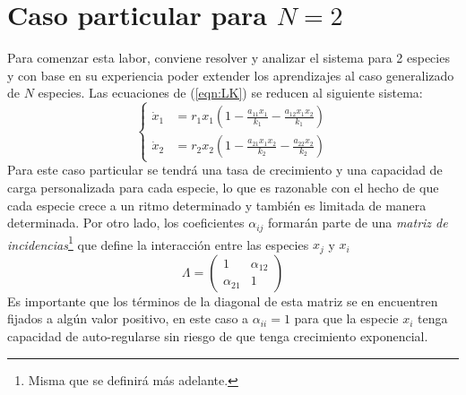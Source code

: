 \section{Caso particular para $N=2$}
Para comenzar esta labor, conviene resolver y analizar el sistema para 2 especies y con base en su experiencia poder extender los aprendizajes al caso generalizado de $N$ especies. Las ecuaciones de (\ref{eqn:LK}) se reducen al siguiente sistema:
$$
\begin{cases}
	\dot{x}_1&=r_1x_1\left (1-\frac{a_{11}x_1}{k_1}-\frac{a_{12}x_1x_2}{k_1}\right )\\
	\dot{x}_2&=r_2x_2\left (1-\frac{a_{21}x_1x_2}{k_2}-\frac{a_{22}x_2}{k_2}\right )
\end{cases}
$$
Para este caso particular se tendrá una tasa de crecimiento y una capacidad de carga personalizada para cada especie, lo que es razonable con el hecho de que cada especie crece a un ritmo determinado y también es limitada de manera determinada. Por otro lado, los coeficientes $\alpha_{ij}$ formarán parte de una \textit{matriz de incidencias}\footnote{Misma que se definirá más adelante.} que define la interacción entre las especies $x_j$ y $x_i$
\begin{equation}\label{eqn:mIncidencias}
	\Lambda=
	\begin{pmatrix}
		1 & \alpha_{12}\\
		\alpha_{21} &1
	\end{pmatrix}
\end{equation}
Es importante que los términos de la diagonal de esta matriz se en encuentren fijados a algún valor positivo, en este caso a $\alpha_{ii}=1$ para que la especie $x_i$ tenga capacidad de auto-regularse sin riesgo de que tenga crecimiento exponencial.


